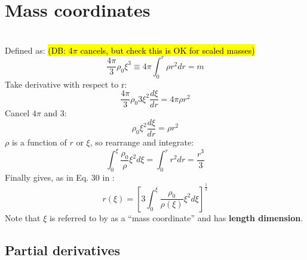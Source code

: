 \documentclass[12pt,notitlepage]{article}
\newcommand{\dbnote}[1]{\sethlcolor{bluehl}\hl{(DB: #1)}}
\begin{document}
\section{Mass coordinates}
\\

\noindent
Defined as: \dbnote{4$\pi$ cancels, but check this is OK for scaled masses}
\begin{equation}
\frac{4 \pi}{3} \rho_0 \xi^3 \equiv 4 \pi \int_0^r \rho r^2 dr = m
\end{equation}
Take derivative with respect to r:
\begin{equation}
\frac{4 \pi}{3} \rho_0 3 \xi^2 \frac{d \xi}{d r} = 4 \pi \rho r^2
\end{equation}
Cancel $4 \pi$ and $3$:
\begin{equation}
\rho_0 \xi^2 \frac{d \xi}{d r} = \rho r ^2
\end{equation}
$\rho$ is a function of $r$ or $\xi$, so rearrange and integrate:
\begin{equation}
\int_0^\xi \frac{\rho_0}{\rho} \xi^2 d\xi = \int_0^r r^2 dr = \frac{r^3}{3}
\end{equation}
Finally gives, as in Eq. 30 in \cite{ABE95}:
\begin{equation}
r(\xi) = \left[ 3 \int_0^\xi \frac{\rho_0}{\rho(\xi)} \xi^2 d\xi \right]^\frac{1}{3}
\end{equation}
Note that $\xi$ is referred to by \cite{ABE95} as a ``mass coordinate'' and has \textbf{length dimension}.

\subsection{Partial derivatives}
\\
\end{document}
